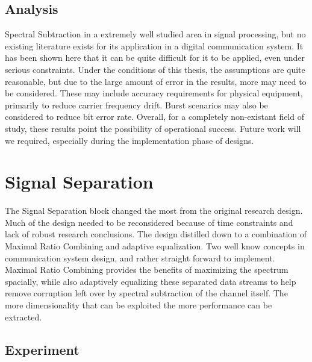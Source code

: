 
\subsection{Analysis}

Spectral Subtraction in a extremely well studied area in signal processing, but no existing literature exists for its application in a digital communication system.  It has been shown here that it can be quite difficult for it to be applied, even under serious constraints.  Under the conditions of this thesis, the assumptions are quite reasonable, but due to the large amount of error in the results, more may need to be considered.  These may include accuracy requirements for physical equipment, primarily to reduce carrier frequency drift.  Burst scenarios may also be considered to reduce bit error rate.  Overall, for a completely non-existant field of study, these results point the possibility of operational success.  Future work will we required, especially during the implementation phase of designs.\\

\section{Signal Separation}

The Signal Separation block changed the most from the original research design.  Much of the design needed to be reconsidered because of time constraints and lack of robust research conclusions.  The design distilled down to a combination of Maximal Ratio Combining and adaptive equalization.  Two well know concepts in communication system design, and rather straight forward to implement.  Maximal Ratio Combining provides the benefits of maximizing the spectrum spacially, while also adaptively equalizing these separated data streams to help remove corruption left over by spectral subtraction of the channel itself.  The more dimensionality that can be exploited the more performance can be extracted.\\

\subsection{Experiment}

